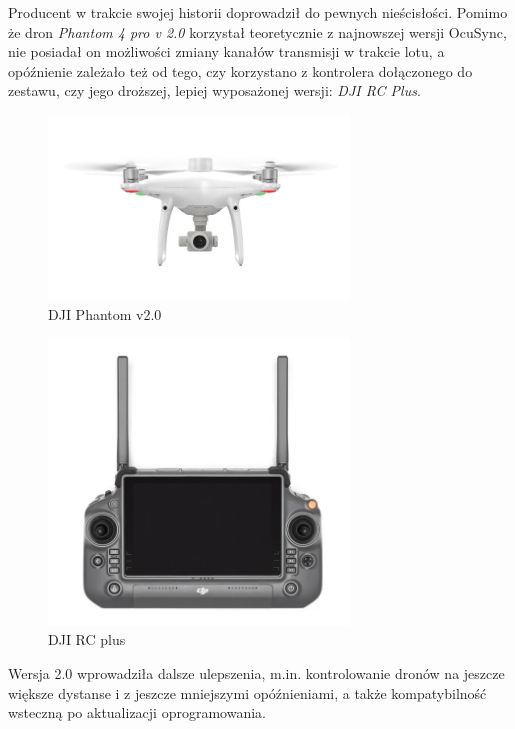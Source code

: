 Producent w trakcie swojej historii doprowadził do pewnych nieścisłości. Pomimo że dron \textit{Phantom 4 pro v 2.0} korzystał teoretycznie z najnowszej wersji OcuSync, nie posiadał on możliwości zmiany kanałów transmisji w trakcie lotu, a opóźnienie zależało też od tego, czy korzystano z kontrolera dołączonego do zestawu, czy jego droższej, lepiej wyposażonej wersji: \textit{DJI RC Plus}.
  

\begin{figure}[!ht]
\begin{center}
  \includegraphics[width=8cm]{./Obrazy/dji-phantom-v2.jpg}
  \caption{DJI Phantom v2.0}
  \end{center}
\end{figure}

  
  
\begin{figure}[!ht]
\begin{center}
  \includegraphics[width=8cm]{./Obrazy/dji-rc-plus.png}
  \caption{DJI RC plus}
  \end{center}
\end{figure}

  
  

Wersja 2.0 wprowadziła dalsze ulepszenia, m.in. kontrolowanie dronów na jeszcze większe dystanse i z jeszcze mniejszymi opóźnieniami, a także kompatybilność wsteczną po aktualizacji oprogramowania.

